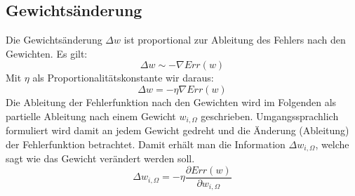\subsection*{Gewichtsänderung}
Die Gewichtsänderung $\Delta w$ ist proportional zur Ableitung des Fehlers nach den Gewichten. Es gilt:
\[
	\Delta w \sim - \nabla Err(w)
\]
Mit $\eta$ als Proportionalitätskonstante wir daraus:
\[
	\Delta w = - \eta \nabla Err(w)
\]
Die Ableitung der Fehlerfunktion nach den Gewichten wird im Folgenden als partielle Ableitung nach einem Gewicht $w_{i,\Omega}$ geschrieben. Umgangssprachlich formuliert wird damit an jedem Gewicht gedreht und die Änderung (Ableitung) der Fehlerfunktion betrachtet. Damit erhält man die Information $\Delta w_{i,\Omega}$, welche sagt wie das Gewicht verändert werden soll.
\[
	\Delta w_{i,\Omega} = - \eta \frac{\partial Err(w)}{\partial w_{i,\Omega}}
\]



